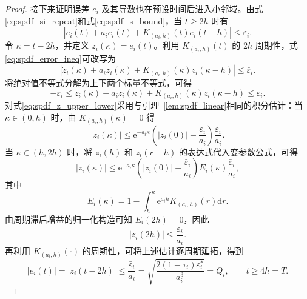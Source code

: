 \begin{proof}
接下来证明误差 $e_i$ 及其导数也在预设时间后进入小邻域。由式\eqref{eq:spdf_si_repeat}和式\eqref{eq:spdf_s_bound}，当 $t\geq2h$ 时有
\begin{equation}
\left|\dot e_i(t)+a_i e_i(t)+K_{(a_i,h)}(t)e_i(t-h)\right|\leq \bar\varepsilon_i.
\label{eq:spdf_error_ineq}
\end{equation}
令 $\kappa=t-2h$，并定义 $z_i(\kappa)=e_i(t)$。利用 $K_{(a_i,h)}(t)$ 的 $2h$ 周期性，式\eqref{eq:spdf_error_ineq}可改写为
\begin{equation}
\left|\dot z_i(\kappa)+a_i z_i(\kappa)+K_{(a_i,h)}(\kappa)z_i(\kappa-h)\right|
\leq \bar\varepsilon_i.
\label{eq:spdf_z_ineq}
\end{equation}
将绝对值不等式分解为上下两个标量不等式，可得
\begin{equation}
-\bar\varepsilon_i
\leq
\dot z_i(\kappa)+a_i z_i(\kappa)+K_{(a_i,h)}(\kappa)z_i(\kappa-h)
\leq
\bar\varepsilon_i .
\label{eq:spdf_z_upper_lower}
\end{equation}
对式\eqref{eq:spdf_z_upper_lower}采用与引理~\ref{lem:spdf_linear}相同的积分估计：当 $\kappa\in(0,h)$ 时，由 $K_{(a_i,h)}(\kappa)=0$ 得
\begin{equation}
|z_i(\kappa)|
\leq
\mathrm e^{-a_i\kappa}\left(|z_i(0)|-\frac{\bar\varepsilon_i}{a_i}\right)
\frac{\bar\varepsilon_i}{a_i}.
\label{eq:spdf_z_first}
\end{equation}
当 $\kappa\in(h,2h)$ 时，将 $z_i(h)$ 和 $z_i(r-h)$ 的表达式代入变参数公式，可得
\begin{equation}
|z_i(\kappa)|
\leq
\mathrm e^{-a_i\kappa}\left(|z_i(0)|-\frac{\bar\varepsilon_i}{a_i}\right)E_i(\kappa)
\frac{\bar\varepsilon_i}{a_i},
\label{eq:spdf_z_second}
\end{equation}
其中
\begin{equation}
E_i(\kappa)=1-\int_h^\kappa \mathrm e^{a_ih}K_{(a_i,h)}(r)\mathrm dr .
\label{eq:spdf_Ei}
\end{equation}
由周期滞后增益的归一化构造可知 $E_i(2h)=0$，因此
\begin{equation}
|z_i(2h)|\leq \frac{\bar\varepsilon_i}{a_i}.
\label{eq:spdf_z_2h}
\end{equation}
再利用 $K_{(a_i,h)}(\cdot)$ 的周期性，可将上述估计逐周期延拓，得到
\begin{equation}
|e_i(t)|=|z_i(t-2h)|
\leq
\frac{\bar\varepsilon_i}{a_i}
=
\sqrt{\frac{2(1-\tau_i)\varepsilon_i^\ast}{a_i^3}}
=Q_i,
\qquad t\geq4h=T.
\label{eq:spdf_e_bound_proof}
\end{equation}


\end{proof}
